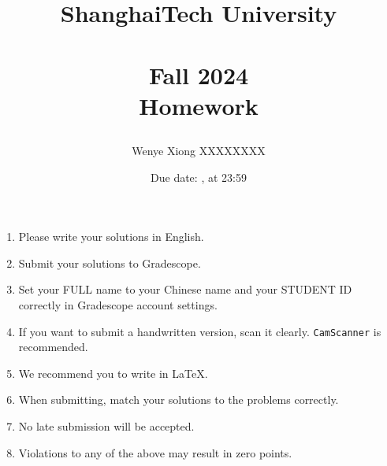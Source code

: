 \documentclass[11pt, addpoints, answers]{exam}
\title{
    \vspace{25pt}
    \LARGE ShanghaiTech University \\
    \bigskip
    \textbf{\CourseName} \\
    \textbf{Fall 2024}   \\
    \bigskip
    Homework \HomeworkNO
    \author{Wenye Xiong XXXXXXXX}
}
\author{}
\date{Due date: \DueDate, at 23:59}
\newcommand{\ttt}{\texttt}
\begin{document}
\maketitle

\vspace{50pt}

\begin{enumerate}
    \item Please write your solutions in English.
    \item Submit your solutions to Gradescope.
    \item Set your FULL name to your Chinese name and your STUDENT ID correctly in Gradescope account settings.
    \item If you want to submit a handwritten version, scan it clearly. \ttt{CamScanner} is recommended.
    \item We recommend you to write in LaTeX.
    \item When submitting, match your solutions to the problems correctly.
    \item No late submission will be accepted.
    \item Violations to any of the above may result in zero points.
\end{enumerate}

\begin{questions}

\newpage


\newpage


\newpage


\newpage


\newpage


\newpage


\newpage


\end{questions}
\end{document}
